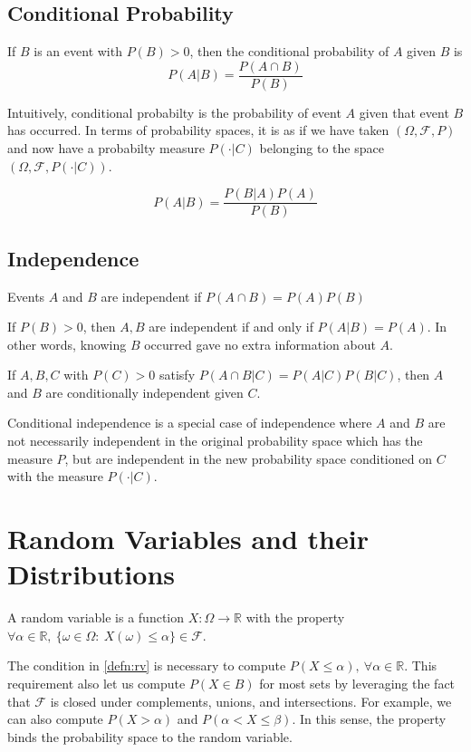 \subsection{Conditional Probability}
\begin{definition}
  If $B$ is an event with $P(B)>0$, then the conditional probability of $A$ given $B$ is
  \[
	P(A|B) = \frac{P(A\cap B)}{P(B)}
  \]
  \label{defn:conditional-prob}
\end{definition}
Intuitively, conditional probabilty is the probability of event $A$ given that event $B$ has occurred.
In terms of probability spaces, it is as if we have taken $(\Omega, \mathcal{F}, P)$ and now have a probabilty measure $P(\cdot|C)$ belonging to the space $(\Omega, \mathcal{F}, P(\cdot|C))$.
\begin{theorem}
  \[
	P(A|B) = \frac{P(B|A)P(A)}{P(B)}
  \]
  \label{thm:bayes}
\end{theorem}
\subsection{Independence}
\begin{definition}
  Events $A$ and $B$ are independent if $P(A\cap B) = P(A)P(B)$
  \label{defn:independence}
\end{definition}
If $P(B)>0$, then $A, B$ are independent if and only if $P(A|B) = P(A)$. In other words, knowing $B$ occurred gave no extra information about $A$.
\begin{definition}
  If $A,B,C$ with $P(C)>0$ satisfy $P(A\cap B|C) = P(A|C)P(B|C)$, then $A$ and $B$ are conditionally independent given $C$.
  \label{defn:conditional-independence}
\end{definition}
Conditional independence is a special case of independence where $A$ and $B$ are not necessarily independent in the original probability space which has the measure $P$, but are independent in the new probability space conditioned on $C$ with the measure $P(\cdot|C)$.
\section{Random Variables and their Distributions}
\begin{definition}
  A random variable is a function $X:\Omega\rightarrow\mathbb{R}$ with the property $\forall \alpha\in\mathbb{R},\ \{\omega\in\Omega:\ X(\omega) \leq \alpha\} \in \mathcal{F}$.
  \label{defn:rv}
\end{definition}
The condition in \cref{defn:rv} is necessary to compute $P(X\leq \alpha),\ \forall \alpha\in\mathbb{R}$.
This requirement also let us compute $P(X\in B)$ for most sets by leveraging the fact that $\mathcal{F}$ is closed under complements, unions, and intersections.
For example, we can also compute $P(X > \alpha)$ and $P(\alpha < X \leq \beta)$.
In this sense, the property binds the probability space to the random variable.

